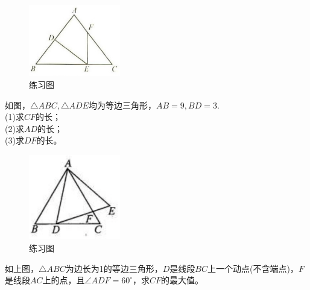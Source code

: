 \documentclass{ecnuthesis}
\begin{document}
\begin{figure}[H]
\centering
\includegraphics[width=4cm]{picture/832.png}
\caption{练习图}
\end{figure}
\begin{problem}
    如图，$\triangle ABC,\triangle ADE$均为等边三角形，$AB=9,BD=3$. \\
    (1)求$CF$的长；\\
    (2)求$AD$的长；\\
    (3)求$DF$的长。\\
\end{problem}
\begin{figure}[H]
\centering
\includegraphics[width=4cm]{picture/839.png}
\caption{练习图}
\end{figure}
\begin{problem}
    如上图，$\triangle ABC$为边长为1的等边三角形，$D$是线段$BC$上一个动点(不含端点)，$F$是线段$AC$上的点，且$\angle ADF=60^\circ$，求$CF$的最大值。
\end{problem}
\clearpage
\end{document}
